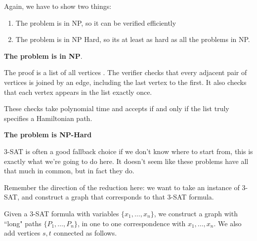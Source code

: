 \documentclass[12pt]{article}
\begin{document}
  {
    Again, we have to show two things:

    \begin{enumerate}
      \item The problem is in NP, so it can be verified efficiently
      \item The problem is in NP Hard, so its at least as hard as all the
        problems in NP.
    \end{enumerate}

    {\bf The problem is in NP}.

    The proof is a list of all vertices . The verifier checks that every
    adjacent pair of vertices is joined by an edge, including the last vertex to
    the first. It also checks that each vertex appears in the list exactly once.

    These checks take polynomial time and accepts if and only if the list
    truly specifies a Hamiltonian path.

    {\bf The problem is NP-Hard}

    3-SAT is often a good fallback choice if we don't know where to start from,
    this is exactly what we're going to do here. It doesn't seem like these
    problems have all that much in common, but in fact they do.

    Remember the direction of the reduction here: we want to take an instance of
    3-SAT, and construct a graph that corresponds to that 3-SAT formula.

    Given a 3-SAT formula with variables $\{x_1, \dots, x_n\}$, we construct a
    graph with ``long" paths $\{P_1, \dots, P_n\}$, in one to one correspondence
    with $x_1, \dots, x_n$. We also add vertices $s, t$ connected as follows.

}
\end{document}
